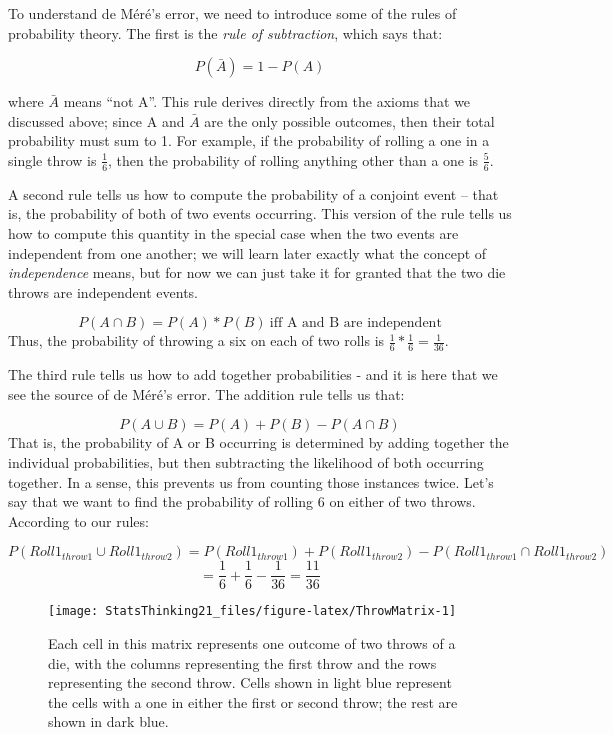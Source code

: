 \documentclass[]{book}
\theoremstyle{definition}
\theoremstyle{definition}
\theoremstyle{definition}
\theoremstyle{remark}
\begin{document}
To understand de Méré's error, we need to introduce some of the rules of
probability theory. The first is the \emph{rule of subtraction}, which
says that:

\[
P(\bar{A}) = 1 - P(A)
\]

where \(\bar{A}\) means ``not A''. This rule derives directly from the
axioms that we discussed above; since A and \(\bar{A}\) are the only
possible outcomes, then their total probability must sum to 1. For
example, if the probability of rolling a one in a single throw is
\(\frac{1}{6}\), then the probability of rolling anything other than a
one is \(\frac{5}{6}\).

A second rule tells us how to compute the probability of a conjoint
event -- that is, the probability of both of two events occurring. This
version of the rule tells us how to compute this quantity in the special
case when the two events are independent from one another; we will learn
later exactly what the concept of \emph{independence} means, but for now
we can just take it for granted that the two die throws are independent
events.

\[
P(A \cap B) = P(A) * P(B)\ \text{iff A and B are independent}
\] Thus, the probability of throwing a six on each of two rolls is
\(\frac{1}{6}*\frac{1}{6}=\frac{1}{36}\).

The third rule tells us how to add together probabilities - and it is
here that we see the source of de Méré's error. The addition rule tells
us that:

\[
P(A \cup B) = P(A) + P(B) - P(A \cap B)
\] That is, the probability of A or B occurring is determined by adding
together the individual probabilities, but then subtracting the
likelihood of both occurring together. In a sense, this prevents us from
counting those instances twice. Let's say that we want to find the
probability of rolling 6 on either of two throws. According to our
rules:

\[
P(Roll1_{throw1} \cup Roll1_{throw2}) = P(Roll1_{throw1}) + P(Roll1_{throw2}) - P(Roll1_{throw1} \cap Roll1_{throw2}) 
\] \[
= \frac{1}{6} + \frac{1}{6} - \frac{1}{36} = \frac{11}{36}
\]

\begin{figure}
\texttt{[image: StatsThinking21\_files/figure-latex/ThrowMatrix-1]} \caption{Each cell in this matrix represents one outcome of two throws of a die, with the columns representing the first throw and the rows representing the second throw. Cells shown in light blue represent the cells with a one in either the first or second throw; the rest are shown in dark blue.}\label{fig:ThrowMatrix}
\end{figure}
\end{document}
